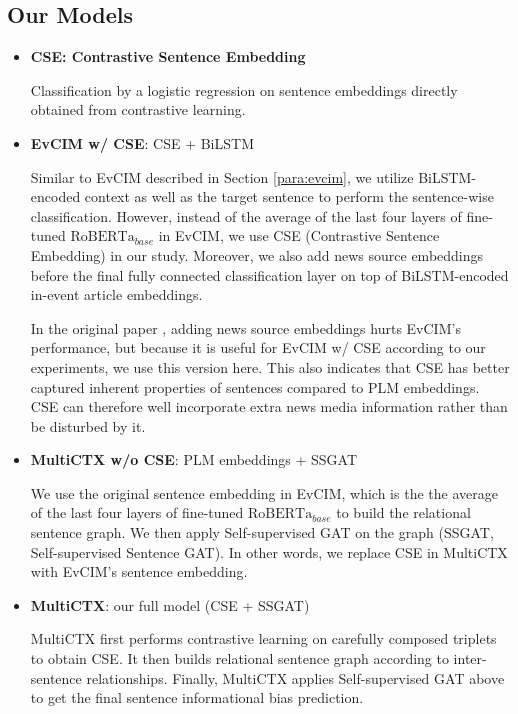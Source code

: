 \subsection{Our Models}
\begin{itemize}
    \item \textbf{CSE: Contrastive Sentence Embedding}
    
    Classification by a logistic regression on sentence embeddings directly obtained from contrastive learning.
    
    \item \textbf{EvCIM w/ CSE}: CSE + BiLSTM
    
    Similar to EvCIM described in Section \ref{para:evcim}, we utilize BiLSTM-encoded context as well as the target sentence to perform the sentence-wise classification. However, instead of the average of the last four layers of fine-tuned $\text{RoBERTa}_{base}$ in EvCIM, we use CSE (Contrastive Sentence Embedding) in our study. Moreover, we also add news source embeddings before the final fully connected classification layer on top of BiLSTM-encoded in-event article embeddings. 
    
    In the original paper \citep{cohan-etal-2019-pretrained}, adding news source embeddings hurts EvCIM's performance, but because it is useful for EvCIM w/ CSE according to our experiments, we use this version here. This also indicates that CSE has better captured inherent properties of sentences compared to PLM embeddings. CSE can therefore well incorporate extra news media information rather than be disturbed by it.
    
    \item \textbf{MultiCTX w/o CSE}: PLM embeddings + SSGAT
    
    We use the original sentence embedding in EvCIM, which is the
    the average of the last four layers of fine-tuned $\text{RoBERTa}_{base}$ to build the relational sentence graph. We then apply Self-supervised GAT on the graph (SSGAT, Self-supervised Sentence GAT). In other words, we replace CSE in MultiCTX with EvCIM's sentence embedding.
    
    \item \textbf{MultiCTX}: our full model (CSE + SSGAT)
    
    MultiCTX first performs contrastive learning on carefully composed triplets to obtain CSE. It then builds relational sentence graph according to inter-sentence relationships. Finally, MultiCTX applies Self-supervised GAT above to get the final sentence informational bias prediction.
    
    
\end{itemize}



